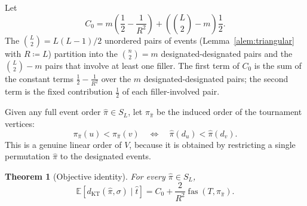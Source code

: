 \documentclass[11pt]{article}
\newtheorem{theorem}{Theorem}
\newcommand{\E}{\mathbb{E}}
\newcommand{\KT}{\operatorname{KT}}
\newcommand{\fas}{\operatorname{fas}}
\begin{document}
Let
\begin{equation}
  C_0=m\left(\frac12-\frac1{R^2}\right)
  +\left(\binom L2-m\right)\frac12 .
\end{equation}
The $\binom L2=L(L-1)/2$ unordered pairs of events (Lemma~\ref{alem:triangular} with $R\coloneqq L$) partition into the $\binom n2=m$ designated-designated pairs and the $\binom L2-m$ pairs that involve at least one filler.  The first term of $C_0$ is the sum of the constant terms $\tfrac12-\tfrac1{R^2}$ over the $m$ designated-designated pairs; the second term is the fixed contribution $\tfrac12$ of each filler-involved pair.

Given any full event order $\hat\pi\in S_L$, let $\pi_{\hat\pi}$ be the induced order of the tournament vertices:
\begin{equation}
  \pi_{\hat\pi}(u)<\pi_{\hat\pi}(v)
  \quad\Longleftrightarrow\quad
  \hat\pi(d_u)<\hat\pi(d_v).
\end{equation}
This is a genuine linear order of $V$, because it is obtained by restricting a single permutation $\hat\pi$ to the designated events.

\begin{theorem}[Objective identity]\label{thm:objident}
For every $\hat\pi\in S_L$,
\begin{equation}
  \E\left[d_{\KT}(\hat\pi,\sigma)\mid \hat t\right]
  =C_0+\frac2{R^2}\fas(T,\pi_{\hat\pi}).
  \label{eq:objective-identity}
\end{equation}
\end{theorem}
\end{document}
